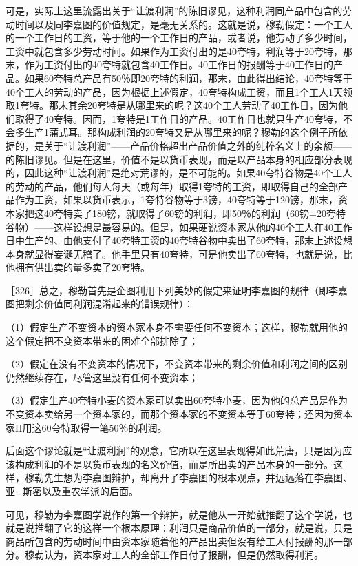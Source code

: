 可是，实际上这里流露出关于“让渡利润”的陈旧谬见，这种利润同产品中包含的劳动时间以及同李嘉图的价值规定，是毫无关系的。这就是说，穆勒假定：一个工人的一个工作日的工资，等于他的一个工作日的产品，或者说，他劳动了多少时间，工资中就包含多少劳动时间。如果作为工资付出的是40夸特，利润等于20夸特，那末，作为工资付出的40夸特就包含40工作日。40工作日的报酬等于40工作日的产品。如果60夸特总产品有50％即20夸特的利润，那末，由此得出结论，40夸特等于40个工人的劳动的产品，因为根据上述假定，40夸特构成工资，而且1个工人1天领取1夸特。那末其余20夸特是从哪里来的呢？这40个工人劳动了40工作日，因为他们取得了40夸特。因而，1夸特是1工作日的产品。40工作日也就只生产40夸特，不会多生产1蒲式耳。那构成利润的20夸特又是从哪里来的呢？穆勒的这个例子所依据的，是关于“让渡利润”——产品价格超出产品价值之外的纯粹名义上的余额——的陈旧谬见。但是在这里，价值不是以货币表现，而是以产品本身的相应部分表现的，因此这种“让渡利润”是绝对荒谬的，是不可能的。如果40夸特谷物是40个工人的劳动的产品，他们每人每天（或每年）取得1夸特的工资，即取得自己的全部产品作为工资，如果以货币表示，1夸特谷物等于3镑，40夸特等于120镑，那末，资本家把这40夸特卖了180镑，就取得了60镑的利润，即50％的利润（60镑=20夸特谷物）——这样设想是最容易的。但是，如果硬说资本家从他的40个工人在40工作日中生产的、由他支付了40夸特工资的40夸特谷物中卖出了60夸特，那末上述设想本身就显得妄诞无稽了。他手里只有40夸特，可是他卖出了60夸特，也就是说，比他拥有供出卖的量多卖了20夸特。

［326］总之，穆勒首先是企图利用下列美妙的假定来证明李嘉图的规律（即李嘉图把剩余价值同利润混淆起来的错误规律）：

（1）假定生产不变资本的资本家本身不需要任何不变资本；这样，穆勒就用他的这个假定把不变资本带来的困难全部排除了；

（2）假定在没有不变资本的情况下，不变资本带来的剩余价值和利润之间的区别仍然继续存在，尽管这里没有任何不变资本；

（3）假定生产40夸特小麦的资本家可以卖出60夸特小麦，因为他的总产品是作为不变资本卖给另一个资本家的，而那个资本家的不变资本等于60夸特；还因为资本家II用这60夸特取得一笔50％的利润。

后面这个谬论就是“让渡利润”的观念，它所以在这里表现得如此荒唐，只是因为应该构成利润的不是以货币表现的名义价值，而是所出卖的产品本身的一部分。这样，穆勒先生想为李嘉图辩护，却离开了李嘉图的根本观点，并远远落在李嘉图、亚·斯密以及重农学派的后面。

可见，穆勒为李嘉图学说作的第一个辩护，就是他从一开始就推翻了这个学说，也就是说推翻了它的这样一个根本原理：利润只是商品价值的一部分，就是说，只是商品所包含的劳动时间中由资本家随着他的产品出卖但没有给工人付报酬的那一部分。穆勒认为，资本家对工人的全部工作日付了报酬，但是仍然取得利润。

